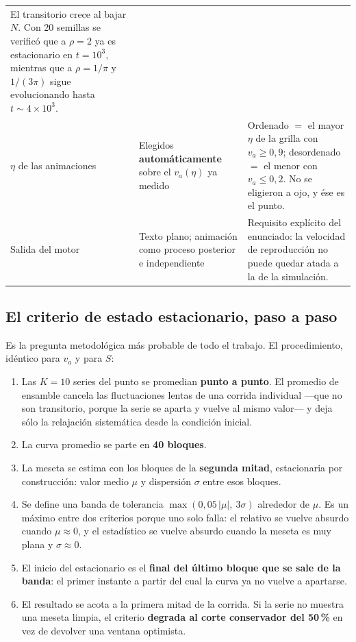 \documentclass[11pt]{article}
\begin{document}
\begin{center}
\begin{tabular}{p{3.5cm}p{4.4cm}p{5.6cm}}
  El transitorio crece al bajar $N$. Con 20 semillas se verificó que a $\rho = 2$ ya es estacionario en $t = 10^3$, mientras que a $\rho = 1/\pi$ y $1/(3\pi)$ sigue evolucionando hasta $t \sim 4\times10^3$. \\
  \addlinespace
  $\eta$ de las animaciones &
  Elegidos \textbf{automáticamente} sobre el $v_a(\eta)$ ya medido &
  Ordenado $=$ el mayor $\eta$ de la grilla con $v_a \geq 0{,}9$; desordenado $=$ el menor con $v_a \leq 0{,}2$. No se eligieron a ojo, y ése es el punto. \\
  \addlinespace
  Salida del motor &
  Texto plano; animación como proceso posterior e independiente &
  Requisito explícito del enunciado: la velocidad de reproducción no puede quedar atada a la de la simulación. \\
  \bottomrule
\end{tabular}
\end{center}

\subsection{El criterio de estado estacionario, paso a paso}
\label{sec:estac}

Es la pregunta metodológica más probable de todo el trabajo. El procedimiento,
idéntico para $v_a$ y para $S$:

\begin{enumerate}
  \item Las $K = 10$ series del punto se promedian \textbf{punto a punto}. El
    promedio de ensamble cancela las fluctuaciones lentas de una corrida
    individual ---que no son transitorio, porque la serie se aparta y vuelve al
    mismo valor--- y deja sólo la relajación sistemática desde la condición
    inicial.
  \item La curva promedio se parte en \textbf{40 bloques}.
  \item La meseta se estima con los bloques de la \textbf{segunda mitad},
    estacionaria por construcción: valor medio $\mu$ y dispersión $\sigma$ entre
    esos bloques.
  \item Se define una banda de tolerancia $\max(0{,}05\,|\mu|,\ 3\sigma)$
    alrededor de $\mu$. Es un máximo entre dos criterios porque uno solo falla:
    el relativo se vuelve absurdo cuando $\mu \approx 0$, y el estadístico se
    vuelve absurdo cuando la meseta es muy plana y $\sigma \approx 0$.
  \item El inicio del estacionario es el \textbf{final del último bloque que se
    sale de la banda}: el primer instante a partir del cual la curva ya no
    vuelve a apartarse.
  \item El resultado se acota a la primera mitad de la corrida. Si la serie no
    muestra una meseta limpia, el criterio \textbf{degrada al corte conservador
    del 50\,\%} en vez de devolver una ventana optimista.
\end{enumerate}
\end{document}
